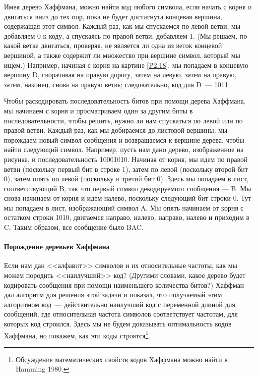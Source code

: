 Имея дерево Хаффмана, можно найти код любого символа, если
начать с корня и двигаться вниз до тех пор, пока не будет достигнута
концевая вершина, содержащая этот символ.  Каждый раз, как мы
спускаемся по левой ветви, мы добавляем 0 к коду, а спускаясь по правой 
ветви, добавляем 1.  (Мы решаем, по какой ветке двигаться, проверяя, не  
является ли одна из веток концевой вершиной, а также
содержит ли множество при вершине символ, который мы ищем.)
Например, начиная с корня на картине \ref{P2.18}, мы
попадаем в концевую вершину D, сворачивая на правую дорогу, затем на
левую, затем на правую, затем, наконец, снова на правую ветвь; следовательно, 
код для D~--- 1011.

Чтобы раскодировать последовательность битов при помощи
дерева Хаффмана, мы начинаем с корня и просматриваем один за другим 
биты в последовательности, чтобы решить, нужно ли нам спускаться по левой
или по правой ветви.  Каждый раз, как мы добираемся до листовой
вершины, мы порождаем новый символ сообщения и возвращаемся к
вершине дерева, чтобы найти следующий символ.  Например, пусть нам
дано дерево, изображенное на рисунке, и последовательность 10001010.
Начиная от корня, мы идем по правой ветви (поскольку первый бит в
строке 1), затем по левой (поскольку второй бит 0), затем опять по
левой (поскольку и третий бит 0).  Здесь мы попадаем в лист,
соответствующий B, так что первый символ декодируемого сообщения ---
B.  Мы снова начинаем от корня и идем налево, поскольку следующий бит
строки 0.  Тут мы попадаем в лист, изображающий символ A.  Мы опять
начинаем от корня с остатком строки 1010, двигаемся направо,
налево, направо, налево и приходим в C.  Таким образом, все сообщение
было BAC.

\paragraph{Порождение деревьев Хаффмана}


Если нам дан <<алфавит>> символов и их относительные
частоты, как мы можем породить <<наилучший>> код?  (Другими словами,
какое дерево будет кодировать сообщения при помощи наименьшего
количества битов?)  Хаффман дал алгоритм для решения этой задачи и
показал, что получаемый этим алгоритмом код~--- действительно наилучший 
код с переменной длиной для сообщений, где относительная частота символов
соответствует частотам, для которых код строился.  Здесь мы не
будем доказывать 
оптимальность кодов Хаффмана, но покажем, как эти коды строятся\footnote{Обсуждение математических свойств кодов Хаффмана
можно найти в Hamming 1980.}.

